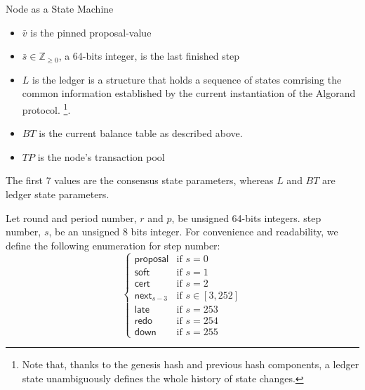 \documentclass[10pt,a4paper]{article}
\begin{document}
\begin{section}{Node as a State Machine}
\begin{itemize}
    \item
    $\bar{v}$ is the pinned proposal-value
    
    \item
    $\bar{s}\in\mathbb{Z}_{\ge 0}$, a 64-bits integer, is the {\sf last finished step}
    
    \item
    $L$ is the {\sf ledger} is a structure that holds a sequence of states comrising the common
    information established by the current instantiation of the Algorand protocol.
    \footnote{Note that, thanks to the genesis hash and previous 
    hash components, a ledger state unambiguously defines the whole history of state changes.}. 
    
    \item
    $BT$ is the current balance table as described above.
    
    \item
    $TP$ is the node's transaction pool
\end{itemize}
The first 7 values are the {\sf consensus state parameters},
whereas $L$ and $BT$ are {\sf ledger state parameters}.

Let round and period number, $r$ and $p$, be unsigned 64-bits integers. 
step number, $s$, be an unsigned 8 bits integer.
For convenience and readability, we define the following enumeration for step number:
\begin{equation}\label{table:s}
\left\{    
    \begin{array}{ll}
        \mathsf{proposal}&\mbox{if }s=0 \\
        \mathsf{soft}&\mbox{if }s=1 \\
        \mathsf{cert}&\mbox{if }s=2\\
        \mathsf{next}_{s-3}&\mbox{if }s\in [3, 252]\\
        \mathsf{late}&\mbox{if }s=253\\
        \mathsf{redo}&\mbox{if }s=254\\
        \mathsf{down}&\mbox{if }s=255
    \end{array}
\right.
\end{equation}


\end{section}
\end{document}
